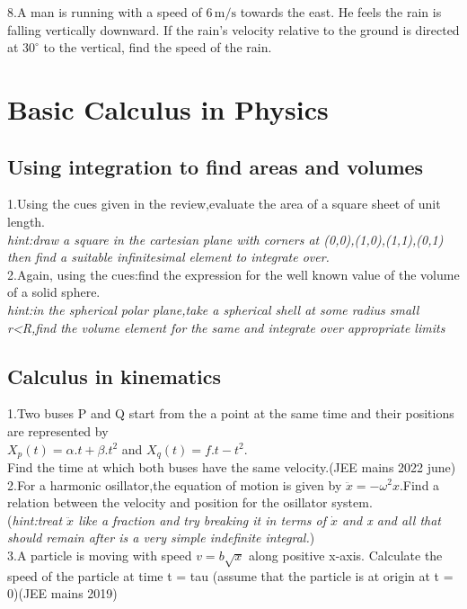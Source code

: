 \documentclass[12pt]{article}
\begin{document}
8.A man is running with a speed of \( 6 \, \text{m/s} \) towards the east. He feels the rain is falling vertically downward. If the rain's velocity relative to the ground is directed at \( 30^\circ \) to the vertical, find the speed of the rain.


\vspace{0.5cm}

\section*{Basic Calculus in Physics}
\subsection{Using integration to find areas and volumes}
1.Using the cues given in the review,evaluate the area of a square sheet of unit length.\\
\textit{hint:draw a square in the cartesian plane with corners at (0,0),(1,0),(1,1),(0,1) then find a suitable infinitesimal element to integrate over.}\\

2.Again, using the cues:find the expression for the well known value of the volume of a solid sphere.\\
\textit{hint:in the spherical polar plane,take a spherical shell at some radius small r<R,find the volume element for the same and integrate over appropriate limits}

\subsection{Calculus in kinematics}
1.Two buses P and Q start from the a point at the same time and their positions are represented by\\ $X_p(t)=\alpha.t+\beta.t^2$ and $X_q(t)=f.t-t^2$.\\
Find the time at which both buses have the same velocity.(JEE mains 2022 june)\\

2.For a harmonic osillator,the equation of motion is given by $\ddot{x}=-\omega^2x$.Find a relation between the velocity and position for the osillator system.\\
(\textit{hint:treat $\ddot{x}$ like a fraction and try breaking it in terms of $\dot{x}$ and x and all that should remain after is a very simple indefinite integral.})\\

3.A particle is moving with speed $v = b\sqrt{x}$ along positive x-axis. Calculate the speed of the particle at time t = tau (assume that the particle is at origin at t = 0)(JEE mains 2019)
\end{document}
